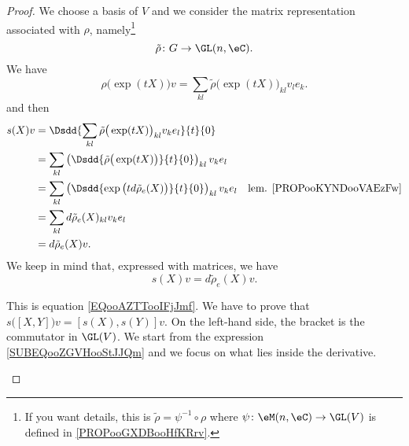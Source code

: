 \begin{proof}
	We choose a basis of \( V\) and we consider the matrix representation associated with \( \rho\), namely\footnote{If you want details, this is \( \tilde \rho=\psi^{-1}\circ\rho\) where \( \psi\colon \eM(n,\eC)\to \GL(V)\) is defined in \ref{PROPooGXDBooHfKRrv}.}
	\begin{equation}
		\tilde \rho\colon G\to \GL(n,\eC).
	\end{equation}
	We have
	\begin{equation}
		\rho\big( \exp(tX) \big)v=\sum_{kl}\tilde \rho\big( \exp(tX) \big)_{kl}v_le_k.
	\end{equation}
	and then
	\begin{subequations}
		\begin{align}
			s(X)v & =\Dsdd{ \sum_{kl}\tilde \rho\big( \exp(tX) \big)_{kl}v_ke_l }{t}{0}                                                                                       \\
			      & =\sum_{kl}\left( \Dsdd{ \tilde \rho\big( \exp(tX) \big) }{t}{0}\right)_{kl}v_ke_l      \label{SUBEQooZGVHooStJJQm}                                        \\
			      & =\sum_{kl}\left( \Dsdd{  \exp\big( td\tilde \rho_e(X) \big)  }{t}{0}\right)_{kl}v_ke_l                             & \text{lem. \ref{PROPooKYNDooVAEzFw}} \\
			      & =\sum_{kl}d\tilde \rho_e(X)_{kl}v_ke_l                                                                                                                    \\
			      & =d\tilde \rho_e(X)v.
		\end{align}
	\end{subequations}
	We keep in mind that, expressed with matrices, we have
	\begin{equation}    \label{EQooAZTTooIFjJmf}
		s(X)v=d\tilde \rho_e(X)v.
	\end{equation}

	\begin{subproof}
		\spitem[\( s\) is linear]
		This is equation \eqref{EQooAZTTooIFjJmf}.
		We have to prove that \( s\big( [X,Y] \big)v=[s(X),s(Y)]v\). On the left-hand side, the bracket is the commutator in \( \GL(V)\). We start from the expression \eqref{SUBEQooZGVHooStJJQm} and we focus on what lies inside the derivative.


\end{subproof}
\end{proof}
